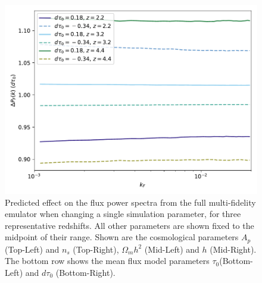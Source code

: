 \documentclass[a4paper,11pt]{article}
\begin{document}
\begin{figure}
    \includegraphics[width=0.48\columnwidth]{figures/single_param_dtau0.pdf}
    \caption{Predicted effect on the flux power spectra from the full multi-fidelity emulator when changing a single simulation parameter, for three representative redshifts. All other parameters are shown fixed to the midpoint of their range. Shown are the cosmological parameters $A_p$ (Top-Left) and $n_s$ (Top-Right), $\Omega_m h^2$ (Mid-Left) and $h$ (Mid-Right). The bottom row shows the mean flux model parameters $\tau_0$(Bottom-Left) and $d\tau_0$ (Bottom-Right).}
    \label{fig:Apnsfluxpower}
\end{figure}
\end{document}
